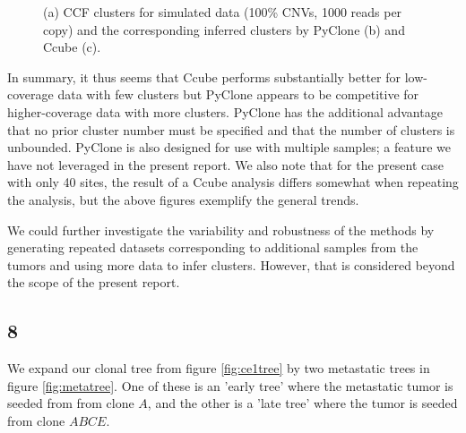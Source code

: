\documentclass{article}
\begin{document}
\begin{figure}[h]
\begin{subfigure}[t]{0.32\linewidth}
		\subcaption{}
	\end{subfigure}%
\caption{(a) CCF clusters for simulated data (100\% CNVs, 1000 reads per copy) and the corresponding inferred clusters by PyClone (b) and Ccube (c).}
\label{fig:simdeep}
\end{figure}

\newpage

In summary, it thus seems that Ccube performs substantially better for low-coverage data with few clusters but PyClone appears to be competitive for higher-coverage data with more clusters. PyClone has the additional advantage that no prior cluster number must be specified and that the number of clusters is unbounded. PyClone is also designed for use with multiple samples; a feature we have not leveraged in the present report. We also note that for the present case with only 40 sites, the result of a Ccube analysis differs somewhat when repeating the analysis, but the above figures exemplify the general trends.

We could further investigate the variability and robustness of the methods by generating repeated datasets corresponding to additional samples from the tumors and using more data to infer clusters. However, that is considered beyond the scope of the present report.

\subsection*{8}

We expand our clonal tree from figure \ref{fig:ce1tree} by two metastatic trees in figure \ref{fig:metatree}. One of these is an 'early tree' where the metastatic tumor is seeded from from clone $A$, and the other is a 'late tree' where the tumor is seeded from clone $ABCE$.
\end{document}
